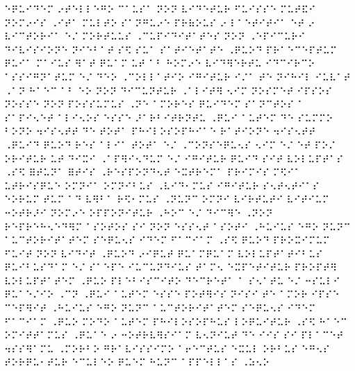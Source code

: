 \documentclass{scrartcl}
\begin{document}
⠑⠟⠥⠊⠙⠑⠍ ⠔⠞⠑⠇⠇⠑⠛⠕ ⠉⠁⠥⠎⠁ ⠝⠕⠝ ⠧⠊⠙⠑⠞⠥⠗ ⠋⠥⠊⠎⠎⠑ ⠍⠥⠞⠯⠊ ⠝⠕⠍⠔⠊⠎ ⠠⠊⠞⠁ ⠍⠥⠇⠞⠕ ⠎⠁⠝⠛⠥⠔⠑ ⠏⠗⠷⠕⠥⠎ ⠔ ⠇⠁⠑⠞⠊⠞⠊⠁ ⠑⠞ ⠔ ⠧⠊⠉⠞⠕⠗⠊⠁ ⠑⠌ ⠍⠕⠗⠞⠥⠥⠎ ⠠⠉⠥⠏⠊⠙⠊⠞⠁⠞⠑⠎ ⠝⠕⠝ ⠠⠑⠏⠊⠉⠥⠗⠊ ⠙⠊⠧⠊⠎⠊⠕⠝⠑ ⠝⠊⠑⠃⠁⠞ ⠎⠫ ⠎⠥⠁ ⠎⠁⠞⠊⠑⠞⠁⠞⠑ ⠠⠟⠥⠕⠙ ⠏⠗⠁⠑⠉⠑⠏⠞⠥⠍ ⠟⠥⠊⠁ ⠍⠁⠊⠥⠎ ⠻⠁⠞ ⠟⠥⠁⠍ ⠥⠞ ⠁⠃ ⠓⠕⠍⠔⠑ ⠧⠊⠙⠻⠑⠗⠞⠥ ⠊⠙⠉⠊⠗⠉⠕ ⠁⠎⠎⠊⠛⠝⠁⠞⠥⠍ ⠑⠌ ⠙⠑⠕ ⠠⠉⠕⠇⠇⠁⠞⠊⠕ ⠊⠛⠊⠞⠥⠗ ⠊⠌⠁ ⠞⠑ ⠝⠊⠓⠊⠇ ⠊⠥⠧⠁⠞ ⠠⠁⠝ ⠓⠁⠑⠉ ⠁⠃ ⠑⠕ ⠝⠕⠝ ⠙⠊⠉⠥⠝⠞⠥⠗ ⠠⠁⠇⠊⠞⠻ ⠢⠊⠍ ⠝⠕⠎⠍⠑⠞ ⠊⠏⠎⠕⠎ ⠝⠕⠎⠎⠑ ⠝⠕⠝ ⠏⠕⠎⠎⠥⠍⠥⠎ ⠠⠝⠑ ⠁⠍⠕⠗⠑⠎ ⠟⠥⠊⠙⠑⠍ ⠎⠁⠝⠉⠞⠕⠎ ⠁ ⠎⠁⠏⠊⠢⠑⠞ ⠁⠇⠊⠢⠕⠎ ⠑⠎⠎⠑ ⠜⠁⠗⠃⠊⠞⠗⠝⠞⠥ ⠠⠟⠥⠊ ⠁⠥⠞⠑⠍ ⠙⠑ ⠎⠥⠍⠍⠕ ⠃⠕⠝⠕ ⠲⠊⠎⠢⠞⠞ ⠙⠑ ⠞⠕⠞⠁ ⠏⠓⠊⠇⠕⠎⠕⠏⠓⠊⠁⠑ ⠗⠁⠞⠊⠕⠝⠑ ⠲⠊⠎⠢⠞⠞ ⠠⠟⠥⠊⠙ ⠟⠥⠕⠙ ⠗⠑⠎ ⠁⠇⠊⠁ ⠞⠕⠞⠁ ⠑⠌ ⠠⠉⠕⠝⠎⠑⠟⠥⠢⠎ ⠢⠊⠍ ⠑⠌ ⠑⠞ ⠏⠕⠌ ⠕⠗⠊⠞⠥⠗ ⠥⠞ ⠙⠊⠭⠊ ⠠⠁⠏⠻⠊⠢⠙⠥⠍ ⠑⠌ ⠊⠛⠊⠞⠥⠗ ⠟⠥⠊⠙ ⠎⠊⠞ ⠧⠕⠇⠥⠏⠞⠁⠎ ⠠⠎⠫ ⠿⠞⠥⠝⠁ ⠿⠞⠊⠎ ⠠⠗⠑⠎⠏⠕⠝⠙⠢⠞ ⠑⠭⠞⠗⠑⠍⠁ ⠏⠗⠊⠍⠊⠎ ⠍⠫⠊⠁ ⠥⠞⠗⠊⠎⠟⠥⠑ ⠕⠍⠝⠊⠁ ⠕⠍⠝⠊⠃⠥⠎ ⠠⠧⠊⠙⠂⠍⠥⠎ ⠊⠛⠊⠞⠥⠗ ⠎⠢⠞⠢⠞⠊⠁⠎ ⠑⠕⠗⠥⠍ ⠞⠥⠍ ⠁⠙ ⠧⠻⠃⠁ ⠗⠫⠂⠍⠥⠎ ⠠⠝⠥⠝⠉ ⠕⠍⠝⠊ ⠧⠊⠗⠞⠥⠞⠊ ⠧⠊⠞⠊⠥⠍ ⠒⠕⠞⠗⠜⠊ ⠝⠕⠍⠔⠑ ⠕⠏⠏⠕⠝⠊⠞⠥⠗ ⠠⠓⠕⠉ ⠑⠌ ⠙⠊⠉⠻⠑ ⠠⠝⠕⠝ ⠗⠑⠏⠗⠑⠓⠢⠑⠙⠻⠍ ⠁⠎⠕⠞⠕⠎ ⠎⠊ ⠝⠕⠝ ⠑⠎⠎⠢⠞ ⠁⠎⠕⠞⠊ ⠠⠓⠥⠊⠥⠎ ⠑⠛⠕ ⠝⠥⠝⠉ ⠁⠥⠉⠞⠕⠗⠊⠞⠁⠞⠑⠍ ⠎⠑⠟⠥⠢⠎ ⠊⠙⠑⠍ ⠋⠁⠉⠊⠁⠍ ⠠⠎⠫ ⠟⠥⠕⠙ ⠏⠗⠕⠭⠊⠍⠥⠍ ⠋⠥⠊⠞ ⠝⠕⠝ ⠧⠊⠙⠊⠞ ⠠⠟⠥⠕⠙ ⠔⠊⠟⠥⠞ ⠟⠥⠁⠍⠟⠥⠁⠍ ⠧⠕⠇⠥⠏⠞⠁⠞⠊⠃⠥⠎ ⠟⠥⠊⠃⠥⠎⠙⠁⠍ ⠑⠌ ⠎⠁⠑⠏⠑ ⠊⠥⠉⠥⠝⠙⠊⠥⠎ ⠞⠁⠍⠢ ⠑⠭⠏⠑⠞⠊⠞⠥⠗ ⠏⠗⠕⠏⠞⠻ ⠧⠕⠇⠥⠏⠞⠁⠞⠑⠍ ⠠⠟⠥⠕ ⠏⠇⠑⠃⠊⠎⠉⠊⠞⠕ ⠙⠑⠉⠗⠑⠞⠁ ⠁ ⠎⠢⠁⠞⠥ ⠑⠌ ⠒⠎⠥⠇⠊ ⠟⠥⠁⠑⠌⠊⠕ ⠠⠉⠝ ⠠⠟⠥⠊ ⠁⠥⠞⠑⠍ ⠑⠎⠎⠑ ⠏⠕⠞⠻⠊⠎ ⠝⠊⠎⠊ ⠞⠑ ⠁⠍⠕⠗ ⠊⠏⠎⠑ ⠉⠑⠏⠻⠊⠞ ⠠⠓⠥⠊⠥⠎ ⠑⠛⠕ ⠝⠥⠝⠉ ⠁⠥⠉⠞⠕⠗⠊⠞⠁⠞⠑⠍ ⠎⠑⠟⠥⠢⠎ ⠊⠙⠑⠍ ⠋⠁⠉⠊⠁⠍ ⠠⠟⠥⠕ ⠍⠕⠙⠕ ⠁⠥⠞⠑⠍ ⠏⠓⠊⠇⠕⠎⠕⠏⠓⠥⠎ ⠇⠕⠟⠥⠊⠞⠥⠗ ⠠⠎⠫ ⠓⠁⠑⠉ ⠕⠍⠊⠞⠞⠁⠍⠥⠎ ⠠⠟⠥⠁⠑ ⠔ ⠒⠕⠞⠗⠧⠻⠎⠊⠁⠍ ⠧⠢⠝⠊⠥⠞ ⠙⠑ ⠊⠊⠎ ⠎⠊ ⠏⠇⠁⠉⠑⠞ ⠲⠎⠎⠻⠁⠍⠥ ⠠⠍⠕⠗⠃⠕ ⠛⠗⠁⠧⠊⠎⠎⠊⠍⠕ ⠁⠖⠑⠉⠞⠥⠎ ⠑⠭⠥⠇ ⠕⠗⠃⠥⠎ ⠑⠛⠢⠎ ⠞⠕⠗⠟⠥⠂⠞⠥⠗ ⠑⠉⠥⠇⠑⠕ ⠟⠥⠑⠍ ⠓⠥⠝⠉ ⠁⠏⠏⠑⠇⠇⠁⠎ ⠠⠵⠢⠕ 
\end{document}
